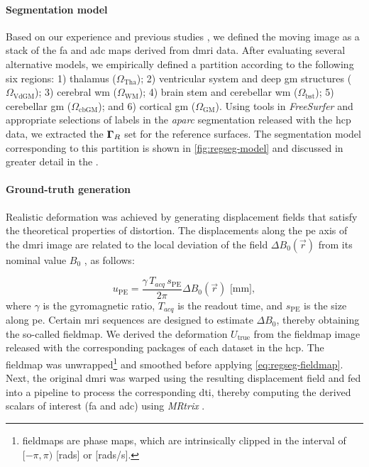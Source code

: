 \paragraph*{Segmentation model}
Based on our experience %
  and previous studies \citep{ennis_orthogonal_2006},
  we defined the moving image as a stack of the \gls*{fa} and \gls*{adc} maps derived
  from \gls*{dmri} data.
After evaluating several alternative models, we empirically defined a partition \omegaset{}
  according to the following six regions:
  1) thalamus ($\Omega_\text{Tha}$);
  2) ventricular system and deep \gls*{gm} structures ($\Omega_\text{VdGM}$);
  3) cerebral \gls*{wm} ($\Omega_\text{WM}$);
  4) brain stem and cerebellar \gls*{wm} ($\Omega_\text{bst}$);
  5) cerebellar \gls*{gm} ($\Omega_\text{cbGM}$); and
  6) cortical \gls*{gm} ($\Omega_\text{GM}$).
Using tools in \emph{FreeSurfer} and appropriate selections of labels in the
  \emph{aparc} segmentation released with the \gls*{hcp} data, we extracted the $\boldsymbol{\Gamma}_R$ set for the
  reference surfaces.
The segmentation model corresponding to this partition is shown in \autoref{fig:regseg-model}
  and discussed in greater detail in the .

\paragraph*{Ground-truth generation}
Realistic deformation was achieved by generating displacement fields that satisfy the theoretical
  properties of distortion.
The displacements along the \gls*{pe} axis of the \gls*{dmri} image are related to the local
  deviation of the field $\Delta B_0(\vec{r})$ from its nominal value $B_0$  \citep{jezzard_correction_1995},
  as follows:

  \begin{equation}
  u_\text{PE} = \frac{\gamma \, T_{acq}\, s_\text{PE}}{2\pi}\Delta B_0(\vec{r})\text{ [mm]},
  \label{eq:regseg-fieldmap}
  \end{equation}
where $\gamma$ is the gyromagnetic ratio, $T_{acq}$ is the readout time, and
  $s_\text{PE}$ is the  size along \gls*{pe}.
Certain \acrshort*{mri} sequences are designed to estimate $\Delta B_0$, thereby obtaining
  the so-called fieldmap.
We derived the deformation $U_\text{true}$ from the fieldmap image released with
  the corresponding packages of each dataset in the \gls*{hcp}.
The fieldmap was unwrapped\footnote{fieldmaps are phase maps, which are intrinsically clipped in the interval
  of $[-\pi, \pi)$ [rads] or [rads/s].} and smoothed before applying \eqref{eq:regseg-fieldmap}.
Next, the original \gls*{dmri} was warped using the resulting displacement field and fed into
  a pipeline to process the corresponding \gls*{dti}, thereby computing the derived scalars of
  interest (\gls*{fa} and \gls*{adc}) using \emph{MRtrix} \citep{tournier_mrtrix_2012}.

